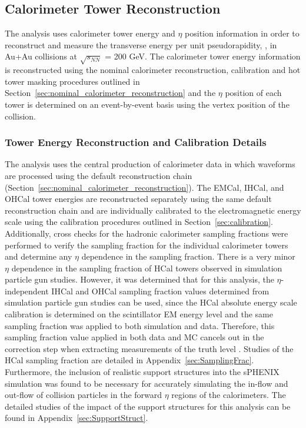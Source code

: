 \subsection{Calorimeter Tower Reconstruction}
\label{sec:towerenergyreco}

The \detdeta analysis uses calorimeter tower energy and $\eta$ position information in order to reconstruct and measure the transverse energy per unit pseudorapidity, \detdeta, in Au+Au collisions at $\sqrt{s_{NN}}$ = 200 GeV.
The calorimeter tower energy information is reconstructed using the nominal calorimeter reconstruction, calibration and hot tower masking procedures outlined in Section~\ref{sec:nominal_calorimeter_reconstruction} and the $\eta$ position of each tower is determined on an event-by-event basis using the vertex position of the collision.

\subsubsection{Tower Energy Reconstruction and Calibration Details}

The \detdeta analysis uses the central production of calorimeter data in which waveforms are processed using the default reconstruction chain (Section~\ref{sec:nominal_calorimeter_reconstruction}).
The EMCal, IHCal, and OHCal tower energies are reconstructed separately using the same default reconstruction chain and are individually calibrated to the electromagnetic energy scale using the calibration procedures outlined in Section~\ref{sec:calibration}.
Additionally, cross checks for the hadronic calorimeter sampling fractions were performed to verify the sampling fraction for the individual calorimeter towers and determine any $\eta$ dependence in the sampling fraction. 
There is a very minor $\eta$ dependence in the sampling fraction of HCal towers observed in simulation particle gun studies. 
However, it was determined that for this analysis, the $\eta$-independent IHCal and OHCal sampling fraction values determined from simulation particle gun studies can be used, since the HCal absolute energy scale calibration is determined on the scintillator EM energy level and the same sampling fraction was applied to both simulation and data. 
Therefore, this sampling fraction value applied in both data and MC cancels out in the correction step when extracting measurements of the truth level \detdeta. 
Studies of the HCal sampling fraction are detailed in Appendix~\ref{sec:SamplingFrac}. 
Furthermore, the inclusion of realistic support structures into the sPHENIX \geant simulation was found to be necessary for accurately simulating the in-flow and out-flow of collision particles in the forward $\eta$ regions of the calorimeters. 
The detailed studies of the impact of the support structures for this analysis can be found in Appendix~\ref{sec:SupportStruct}.

